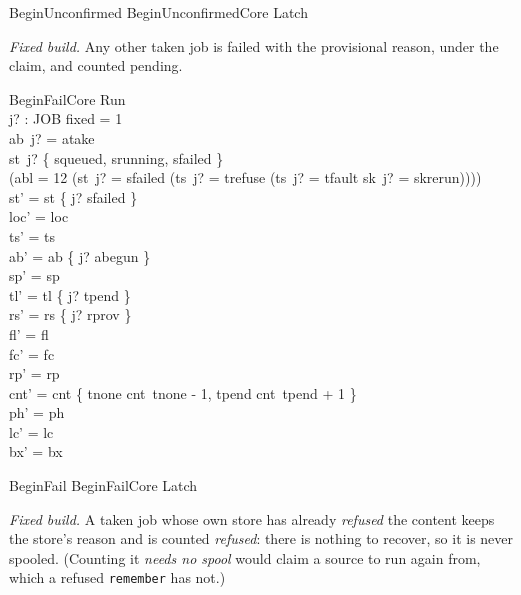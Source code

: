 \documentclass[a4paper,10pt,fleqn]{article}
\newcommand{\field}[1]{\texttt{#1}}
\begin{document}
\begin{zed}
BeginUnconfirmed  BeginUnconfirmedCore \land Latch
\end{zed}

\emph{Fixed build.} Any other taken job is failed with the provisional reason,
under the claim, and counted pending.

\begin{schema}{BeginFailCore}
\Delta Run \\ j? : JOB
\where
fixed = 1 \\
ab~j? = atake \\
st~j? \in \{ squeued, srunning, sfailed \} \\
(abl = 12 \lor \lnot (st~j? = sfailed \land (ts~j? = trefuse \lor (ts~j? = tfault \land sk~j? = skrerun)))) \\
st' = st \oplus \{ j? \mapsto sfailed \} \\
loc' = loc \\
ts' = ts \\
ab' = ab \oplus \{ j? \mapsto abegun \} \\
sp' = sp \\
tl' = tl \oplus \{ j? \mapsto tpend \} \\
rs' = rs \oplus \{ j? \mapsto rprov \} \\
fl' = fl \\
fc' = fc \\
rp' = rp \\
cnt' = cnt \oplus \{ tnone \mapsto cnt~tnone - 1, tpend \mapsto cnt~tpend + 1 \} \\
ph' = ph \\
lc' = lc \\
bx' = bx
\end{schema}

\begin{zed}
BeginFail  BeginFailCore \land Latch
\end{zed}

\emph{Fixed build.} A taken job whose own store has already \emph{refused} the
content keeps the store's reason and is counted \emph{refused}: there is nothing to
recover, so it is never spooled. (Counting it \emph{needs no spool} would claim a
source to run again from, which a refused \field{remember} has not.)
\end{document}
